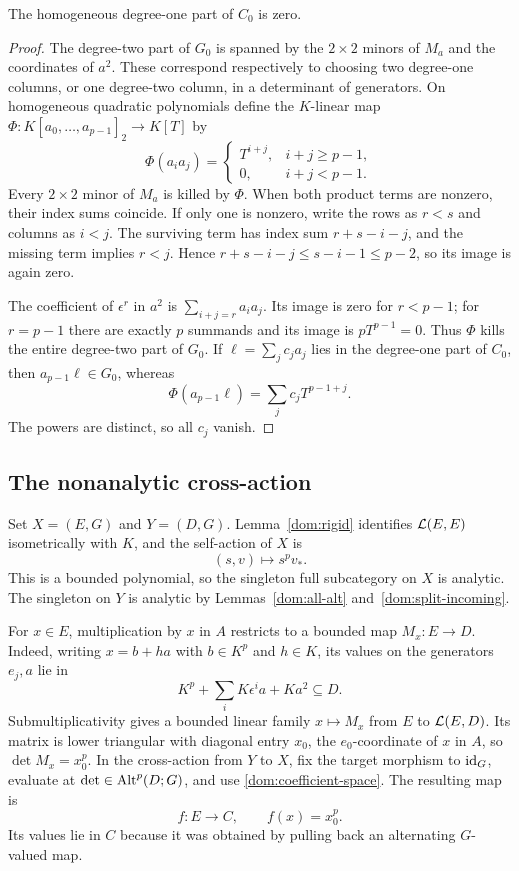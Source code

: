 \begin{lemma}\label{dom:degree-gap}
The homogeneous degree-one part of $C_0$ is zero.
\end{lemma}

\begin{proof}
The degree-two part of $G_0$ is spanned by the $2\times2$ minors of $M_a$ and the coordinates of $a^2$.
These correspond respectively to choosing two degree-one columns, or one degree-two column, in a
determinant of generators. On homogeneous quadratic polynomials define the $K$\nobreakdash-linear map
$\Phi\colon K[a_0,\ldots,a_{p-1}]_2\to K[T]$ by
\[
\Phi(a_i a_j)=
\begin{cases}
T^{i+j},&i+j\ge p-1,\\
0,&i+j<p-1.
\end{cases}
\]
Every $2\times2$ minor of $M_a$ is killed by $\Phi$. When both product terms are nonzero, their index
sums coincide. If only one is nonzero, write the rows as $r<s$ and columns as $i<j$. The surviving term
has index sum $r+s-i-j$, and the missing term implies $r<j$. Hence
$r+s-i-j\le s-i-1\le p-2$, so its image is again zero.

The coefficient of $\epsilon^r$ in $a^2$ is $\sum_{i+j=r}a_i a_j$. Its image is zero for $r<p-1$;
for $r=p-1$ there are exactly $p$ summands and its image is $pT^{p-1}=0$. Thus $\Phi$ kills the entire
degree-two part of $G_0$. If $\ell=\sum_jc_j a_j$ lies in the degree-one part of $C_0$, then
$a_{p-1}\ell\in G_0$, whereas
\[
\Phi(a_{p-1}\ell)=\sum_jc_jT^{p-1+j}.
\]
The powers are distinct, so all $c_j$ vanish.
\end{proof}

\subsection{The nonanalytic cross-action}

Set $X=(E,G)$ and $Y=(D,G)$. Lemma~\ref{dom:rigid} identifies $\mathcal L(E,E)$ isometrically with $K$,
and the self-action of $X$ is
\[
(s,v)\longmapsto s^p v_*.
\]
This is a bounded polynomial, so the singleton full subcategory on $X$ is analytic. The singleton on $Y$
is analytic by Lemmas~\ref{dom:all-alt} and~\ref{dom:split-incoming}.

For $x\in E$, multiplication by $x$ in $A$ restricts to a bounded map $M_x\colon E\to D$.
Indeed, writing $x=b+ha$ with $b\in K^p$ and $h\in K$, its values on the generators $e_j,a$ lie in
\[
K^p+\sum_iK\epsilon^ia+Ka^2\subseteq D.
\]
Submultiplicativity gives a bounded linear family $x\mapsto M_x$ from $E$ to $\mathcal L(E,D)$.
Its matrix is lower triangular with diagonal entry $x_0$, the $e_0$\nobreakdash-coordinate of $x$ in $A$, so $\det M_x=x_0^p$. In the cross-action from
$Y$ to $X$, fix the target morphism to $\mathrm{id}_G$, evaluate at $\det\in\operatorname{Alt}^p(D;G)$, and use
\eqref{dom:coefficient-space}. The resulting map is
\begin{equation}\label{dom:bad-coordinate}
f\colon E\longrightarrow C,\qquad f(x)=x_0^p.
\end{equation}
Its values lie in $C$ because it was obtained by pulling back an alternating $G$\nobreakdash-valued map.

